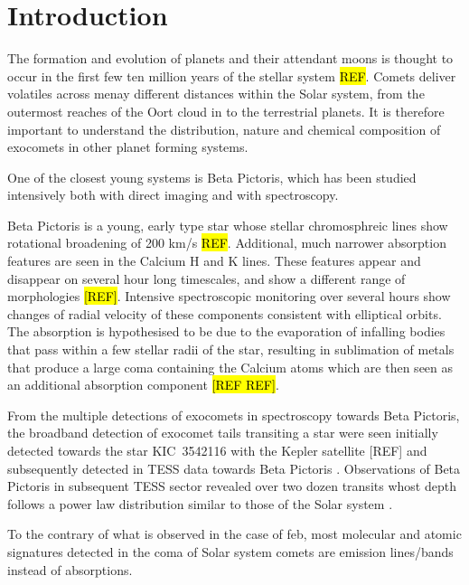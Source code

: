 \documentclass{aa}
\begin{document}
\section{Introduction}

The formation and evolution of planets and their attendant moons is thought to occur in the first few ten million years of the stellar system \hl{REF}.
%
Comets deliver volatiles across menay different distances within the Solar system, from the outermost reaches of the Oort cloud in to the terrestrial planets.
%
It is therefore important to understand the distribution, nature and chemical composition of exocomets in other planet forming systems.

One of the closest young systems is Beta Pictoris, which has been studied intensively both with direct imaging and with spectroscopy.

Beta Pictoris is a young, early type star whose stellar chromosphreic lines show rotational broadening of 200 km/s \hl{REF}.
%
Additional, much narrower absorption features are seen in the Calcium H and K lines.
%
These features appear and disappear on several hour long timescales, and show a different range of morphologies \hl{[REF]}.
%
Intensive spectroscopic monitoring over several hours show changes of radial velocity of these components consistent with elliptical orbits.
%
The absorption is hypothesised to be due to the evaporation of infalling bodies that pass within a few stellar radii of the star, resulting in sublimation of metals that produce a large coma containing the Calcium atoms which are then seen as an additional absorption component \hl{[REF REF]}.

From the multiple detections of exocomets in spectroscopy towards Beta Pictoris, the broadband detection of exocomet tails transiting a star were seen initially detected towards the star KIC~3542116 \citep{Rappaport18} with the Kepler satellite [REF] and subsequently detected in TESS data towards Beta Pictoris \citep{Zieba19}.
%
Observations of Beta Pictoris in subsequent TESS sector revealed over two dozen transits whost depth follows a power law distribution similar to those of the Solar system \citep{LecavelierdesEtangs22,Pavlenko22}.





To the contrary of what is observed in the case of \ac{feb}, most molecular and atomic signatures detected in the coma of Solar system comets are emission lines/bands instead of absorptions.
\end{document}
